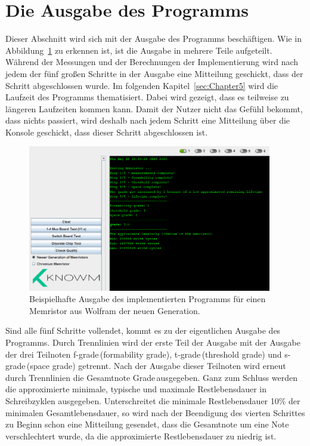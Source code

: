 \section{Die Ausgabe des Programms}

Dieser Abschnitt wird sich mit der Ausgabe des Programms beschäftigen. Wie in Abbildung~\ref{fig:Ausgabe} zu erkennen ist, ist die Ausgabe in mehrere Teile aufgeteilt. Während der Messungen und der Berechnungen der Implementierung wird nach jedem der fünf großen Schritte in der Ausgabe eine Mitteilung geschickt, dass der Schritt abgeschlossen wurde. Im folgenden Kapitel~\ref{sec:Chapter5} wird die Laufzeit des Programms thematisiert. Dabei wird gezeigt, dass es teilweise zu längeren Laufzeiten kommen kann. Damit der Nutzer nicht das Gefühl bekommt, dass nichts passiert, wird deshalb nach jedem Schritt eine Mitteilung über die Konsole geschickt, dass dieser Schritt abgeschlossen ist.

\begin{figure}
  \centering
    \includegraphics[width=0.95\textwidth]{images/Beispiel_Ausgabe.png}
  \caption{Beispielhafte Ausgabe des implementierten Programms für einen Memristor aus Wolfram der neuen Generation.}
  \label{fig:Ausgabe}
\end{figure}

Sind alle fünf Schritte vollendet, kommt es zu der eigentlichen Ausgabe des Programms. Durch Trennlinien wird der erste Teil der Ausgabe mit der Ausgabe der drei Teilnoten \glqq f-grade\grqq\,(formability grade), \glqq t-grade\grqq\,(threshold grade) und \glqq s-grade\grqq\,(space grade) getrennt. Nach der Ausgabe dieser Teilnoten wird erneut durch Trennlinien die Gesamtnote \glqq Grade\grqq\,ausgegeben. Ganz zum Schluss werden die approximierte minimale, typische und maximale Restlebensdauer in Schreibzyklen ausgegeben. Unterschreitet die minimale Restlebensdauer 10\% der minimalen Gesamtlebensdauer, so wird nach der Beendigung des vierten Schrittes zu Beginn schon eine Mitteilung gesendet, dass die Gesamtnote um eine Note verschlechtert wurde, da die approximierte Restlebensdauer zu niedrig ist.




